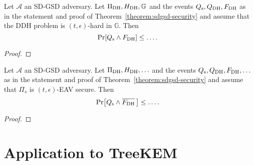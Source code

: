 \begin{lemma} \label{lemma:dh-reduction}
	Let $\mathcal{A}$ an SD-GSD adversary. Let $\Pi_{\mathrm{DH}}, H_\mathrm{DH}, \mathbb{G}$ and the events $Q_\mathrm{s}, Q_\mathrm{DH}, F_\mathrm{DH}$ as in the statement and proof of Theorem~\vref{theorem:sdgsd-security} and assume that the DDH problem is $(t, \epsilon)$-hard in $\mathbb{G}$. Then
	$$
		\pr{\qs \land \fdh} \le \ldots.
	$$
\end{lemma}
\begin{proof}

\end{proof}

\begin{lemma} \label{lemma:eav-reduction}
	Let $\mathcal{A}$ an SD-GSD adversary. Let $\Pi_{\mathrm{DH}}, H_\mathrm{DH}, \ldots$ and the events $Q_\mathrm{s}, Q_\mathrm{DH}, F_\mathrm{DH}, \ldots$ as in the statement and proof of Theorem~\vref{theorem:sdgsd-security} and assume that $\Pi_s$ is $(t, \epsilon)$-EAV secure. Then
	$$
		\pr{\qs \land \overline{\fdh}\,} \le \ldots.
	$$
\end{lemma}
\begin{proof}

\end{proof}

\chapter{Application to TreeKEM}
\label{sec:application-to-treekem}

